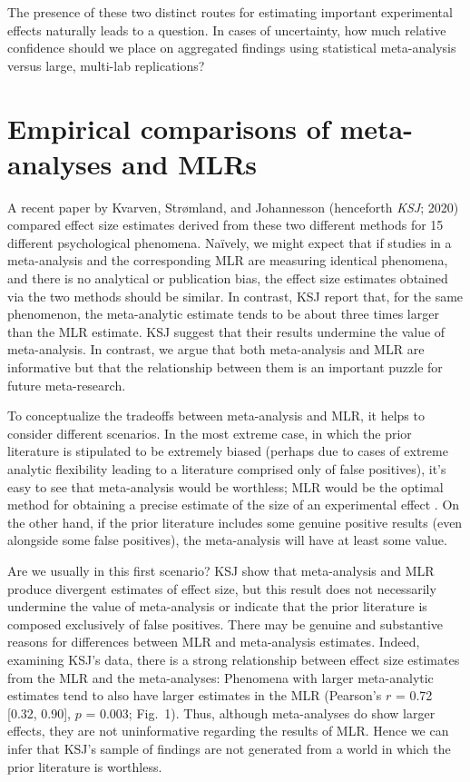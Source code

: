 \documentclass[man]{apa7}
\begin{document}
The presence of these two distinct routes for estimating important experimental effects naturally leads to a question. In cases of uncertainty, how much relative confidence should we place on aggregated findings using statistical meta-analysis versus large, multi-lab replications?  

\section{Empirical comparisons of meta-analyses and MLRs}

A recent paper by Kvarven, Strømland, and Johannesson (henceforth \textit{KSJ}; 2020) compared effect size estimates derived from these two different methods for 15 different psychological phenomena. Na{\"i}vely, we might expect that if studies in a meta-analysis and the corresponding MLR are measuring identical phenomena, and there is no analytical or publication bias, the effect size estimates obtained via the two methods should be similar.  In contrast, KSJ report that, for the same phenomenon, the meta-analytic estimate tends to be about three times larger than the MLR estimate. KSJ suggest that their results undermine the value of meta-analysis. In contrast, we argue that both meta-analysis and MLR are informative but that the relationship between them is an important puzzle for future meta-research. 

To conceptualize the tradeoffs between meta-analysis and MLR, it helps to consider different scenarios. In the most extreme case, in which the prior literature is stipulated to be extremely biased (perhaps due to cases of extreme analytic flexibility leading to a literature comprised only of false positives), it’s easy to see that meta-analysis would be worthless; MLR would be the optimal method for obtaining a precise estimate of the size of an experimental effect \parencite[for a possible example of this type, see e.g.][]{vadillo2016selection}. On the other hand, if the prior literature includes some genuine positive results (even alongside some false positives), the meta-analysis will have at least some value. 

Are we usually in this first scenario? KSJ show that meta-analysis and MLR produce divergent estimates of effect size, but this result does not necessarily undermine the value of meta-analysis or indicate that the prior literature is composed exclusively of false positives. There may be genuine and substantive reasons for differences between MLR and meta-analysis estimates. Indeed, examining KSJ’s data, there is a strong relationship between effect size estimates from the MLR and the meta-analyses: Phenomena with larger meta-analytic estimates tend to also have larger estimates in the MLR (Pearson’s $r$ = 0.72 [0.32, 0.90], $p$ = 0.003; Fig.\ 1). Thus, although meta-analyses do show larger effects, they are not uninformative regarding the results of MLR. Hence we can infer that KSJ’s sample of findings are not generated from a world in which the prior literature is worthless. 
\end{document}
